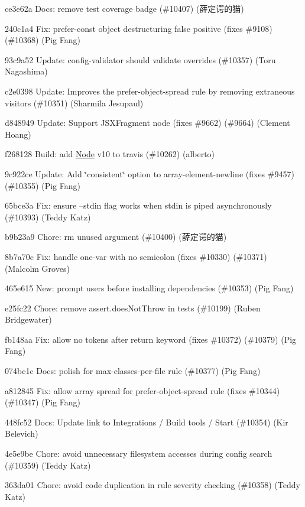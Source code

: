 \begin{DoxyItemize}
\item ce3e62a Docs\+: remove test coverage badge (\#10407) (薛定谔的猫)
\item 240c1a4 Fix\+: prefer-\/const object destructuring false positive (fixes \#9108) (\#10368) (Pig Fang)
\item 93c9a52 Update\+: config-\/validator should validate overrides (\#10357) (Toru Nagashima)
\item c2e0398 Update\+: Improves the prefer-\/object-\/spread rule by removing extraneous visitors (\#10351) (Sharmila Jesupaul)
\item d848949 Update\+: Support J\+S\+X\+Fragment node (fixes \#9662) (\#9664) (Clement Hoang)
\item f268128 Build\+: add \mbox{\hyperlink{class_node}{Node}} v10 to travis (\#10262) (alberto)
\item 9c922ce Update\+: Add \char`\"{}consistent\char`\"{} option to array-\/element-\/newline (fixes \#9457) (\#10355) (Pig Fang)
\item 65bce3a Fix\+: ensure --stdin flag works when stdin is piped asynchronously (\#10393) (Teddy Katz)
\item b9b23a9 Chore\+: rm unused argument (\#10400) (薛定谔的猫)
\item 8b7a70c Fix\+: handle one-\/var with no semicolon (fixes \#10330) (\#10371) (Malcolm Groves)
\item 465e615 New\+: prompt users before installing dependencies (\#10353) (Pig Fang)
\item e25fc22 Chore\+: remove assert.\+does\+Not\+Throw in tests (\#10199) (Ruben Bridgewater)
\item fb148aa Fix\+: allow no tokens after {\ttfamily return} keyword (fixes \#10372) (\#10379) (Pig Fang)
\item 074bc1c Docs\+: polish for max-\/classes-\/per-\/file rule (\#10377) (Pig Fang)
\item a812845 Fix\+: allow array spread for prefer-\/object-\/spread rule (fixes \#10344) (\#10347) (Pig Fang)
\item 448fc52 Docs\+: Update link to Integrations / Build tools / Start (\#10354) (Kir Belevich)
\item 4e5e9be Chore\+: avoid unnecessary filesystem accesses during config search (\#10359) (Teddy Katz)
\item 363da01 Chore\+: avoid code duplication in rule severity checking (\#10358) (Teddy Katz)
\end{DoxyItemize}

